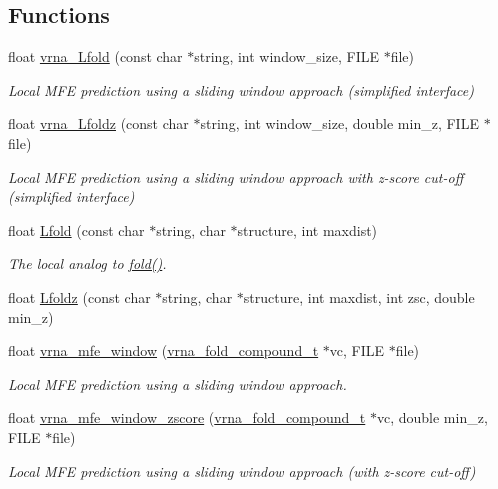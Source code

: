 \subsection*{Functions}
\begin{DoxyCompactItemize}
\item 
float \mbox{\hyperlink{group__local__mfe__fold_ga4918cce52bf69c1913cda503b2ac75d8}{vrna\+\_\+\+Lfold}} (const char $\ast$string, int window\+\_\+size, F\+I\+LE $\ast$file)
\begin{DoxyCompactList}\small\item\em Local M\+FE prediction using a sliding window approach (simplified interface) \end{DoxyCompactList}\item 
float \mbox{\hyperlink{group__local__mfe__fold_ga27fddda5fc63eb49c861e38845fc34b4}{vrna\+\_\+\+Lfoldz}} (const char $\ast$string, int window\+\_\+size, double min\+\_\+z, F\+I\+LE $\ast$file)
\begin{DoxyCompactList}\small\item\em Local M\+FE prediction using a sliding window approach with z-\/score cut-\/off (simplified interface) \end{DoxyCompactList}\item 
float \mbox{\hyperlink{group__local__mfe__fold_ga16e5a70e60835bb969eaecbe6482f1be}{Lfold}} (const char $\ast$string, char $\ast$structure, int maxdist)
\begin{DoxyCompactList}\small\item\em The local analog to \mbox{\hyperlink{group__mfe__fold__single_gaadafcb0f140795ae62e5ca027e335a9b}{fold()}}. \end{DoxyCompactList}\item 
float \mbox{\hyperlink{group__local__mfe__fold_gab6d79eecc180f586679f7b85cce5cbe9}{Lfoldz}} (const char $\ast$string, char $\ast$structure, int maxdist, int zsc, double min\+\_\+z)
\item 
float \mbox{\hyperlink{group__local__mfe__fold_ga689df235a1915a1ad56e377383c044ce}{vrna\+\_\+mfe\+\_\+window}} (\mbox{\hyperlink{group__fold__compound_ga1b0cef17fd40466cef5968eaeeff6166}{vrna\+\_\+fold\+\_\+compound\+\_\+t}} $\ast$vc, F\+I\+LE $\ast$file)
\begin{DoxyCompactList}\small\item\em Local M\+FE prediction using a sliding window approach. \end{DoxyCompactList}\item 
float \mbox{\hyperlink{group__local__mfe__fold_gaa4f67ae94efd08d800c17f9b53423fd6}{vrna\+\_\+mfe\+\_\+window\+\_\+zscore}} (\mbox{\hyperlink{group__fold__compound_ga1b0cef17fd40466cef5968eaeeff6166}{vrna\+\_\+fold\+\_\+compound\+\_\+t}} $\ast$vc, double min\+\_\+z, F\+I\+LE $\ast$file)
\begin{DoxyCompactList}\small\item\em Local M\+FE prediction using a sliding window approach (with z-\/score cut-\/off) \end{DoxyCompactList}\end{DoxyCompactItemize}



